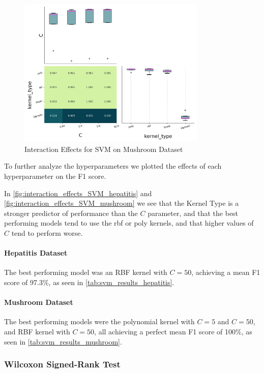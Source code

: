 \begin{figure}
    \centering
    \includegraphics[width=0.8\textwidth]{figures/interaction_effects_SVM_mushroom.png}
    \caption{Interaction Effects for SVM on Mushroom Dataset}
    \label{fig:interaction_effects_SVM_mushroom}
\end{figure}

To further analyze the hyperparameters we plotted the effects of each hyperparameter on the F1 score.

In \autoref{fig:interaction_effects_SVM_hepatitis} and \autoref{fig:interaction_effects_SVM_mushroom} we see that the Kernel Type is a stronger predictor of performance than the $C$ parameter, and that
the best performing models tend to use the rbf or poly kernels, and that higher values of $C$ tend to perform worse.

\paragraph{Hepatitis Dataset}
The best performing model was an RBF kernel with $C=50$, achieving a mean F1 score of 97.3\%, as seen in \autoref{tab:svm_results_hepatitis}.

\paragraph{Mushroom Dataset}
The best performing models were the polynomial kernel with $C=5$ and $C=50$, and RBF kernel with $C=50$, all achieving a perfect mean F1 score of 100\%, as seen in \autoref{tab:svm_results_mushroom}.

\subsubsection{Wilcoxon Signed-Rank Test}

